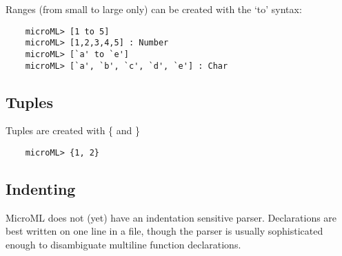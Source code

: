 Ranges (from small to large only) can be created with the `to' syntax:

\begin{verbatim}
    microML> [1 to 5]
    microML> [1,2,3,4,5] : Number
    microML> [`a' to `e'] 
    microML> [`a', `b', `c', `d', `e'] : Char
\end{verbatim}

\subsection{Tuples}
Tuples are created with \{  and \}

\begin{verbatim}
    microML> {1, 2}
\end{verbatim}

\subsection{Indenting}
MicroML does not (yet) have an indentation sensitive parser. Declarations are best written on one
line in a file, though the parser is usually sophisticated enough to disambiguate multiline function
declarations.
